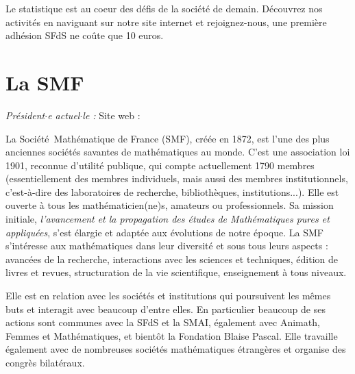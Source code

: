 Le statistique est au coeur des d\'efis de la soci\'et\'e de demain. D\'ecouvrez nos activit\'es en naviguant sur notre site internet et rejoignez-nous, une premi\`ere adh\'esion SFdS ne co\^ute que 10 euros.



\section{La SMF}
\label{smf}

\emph{Pr\'esident$\cdot$e actuel$\cdot$le : } \hfill Site web :  
\smallskip

La Soci\'et\'e\ Math\'ematique de France (SMF), cr\'e\'ee en 1872, est l'une des plus anciennes  soci\'et\'es savantes de math\'ematiques au monde. C'est une association loi 1901, reconnue d'utilit\'e publique, qui compte actuellement 1790 membres (essentiellement des membres individuels, mais aussi des membres institutionnels, c'est-\`a-dire des laboratoires de recherche, biblioth\`eques, institutions...). Elle est ouverte \`a tous les
math\'ematicien(ne)s, amateurs ou professionnels. Sa mission initiale, {\sl l'avancement et la propagation des \'etudes de Math\'ematiques pures et appliqu\'ees}, s'est \'elargie et adapt\'ee aux \'evolutions de notre \'epoque. La SMF s'int\'eresse aux math\'ematiques  dans leur diversit\'e et sous tous leurs aspects :  avanc\'ees de la recherche, interactions avec les sciences et techniques, \'edition de livres et revues,  structuration de la vie scientifique, enseignement \`a tous niveaux.

Elle est en relation avec les soci\'et\'es et institutions qui poursuivent les m\^emes buts et interagit avec beaucoup d'entre elles. En particulier beaucoup de ses actions sont communes avec la SFdS et la SMAI, \'{e}galement avec Animath, Femmes et Math\'{e}matiques, et bient\^ot la Fondation Blaise Pascal. Elle  travaille \'egalement avec de nombreuses soci\'et\'es math\'ematiques \'{e}trang\`{e}res et organise des congr\`{e}s bilat\'{e}raux.

\medskip

